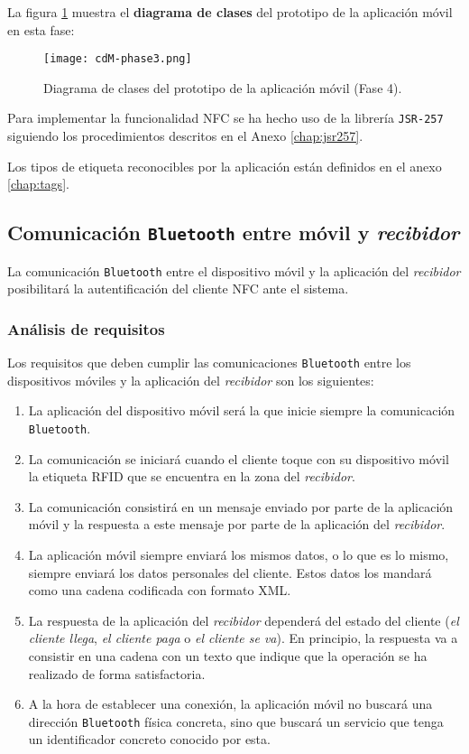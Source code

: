 La figura \ref{fig:cdM-phase3} muestra el \textbf{diagrama de clases} del
prototipo de la aplicación móvil en esta fase:

  \begin{figure}[H]
    \begin{center}
      \texttt{[image: cdM-phase3.png]}
      \caption{Diagrama de clases del prototipo de la aplicación móvil
      (Fase 4).}
      \label{fig:cdM-phase3}
    \end{center}
  \end{figure}

Para implementar la funcionalidad \acs{NFC} se ha hecho uso de la
librería \texttt{\acs{JSR}-257} siguiendo los procedimientos descritos en el 
Anexo \ref{chap:jsr257}.

Los tipos de etiqueta reconocibles por la aplicación están definidos en el 
anexo \ref{chap:tags}.

\subsection{Comunicación \texttt{Bluetooth} entre móvil y \emph{recibidor}}
\label{subsec:mobile-receiver}
La comunicación \texttt{Bluetooth} entre el dispositivo móvil y la aplicación
del \emph{recibidor} posibilitará la autentificación del cliente \acs{NFC}
ante el sistema.

\subsubsection{Análisis de requisitos}
Los requisitos que deben cumplir las comunicaciones \texttt{Bluetooth} entre
los dispositivos móviles y la aplicación del \emph{recibidor} son los
siguientes:
\begin{enumerate}
\item La aplicación del dispositivo móvil será la que inicie siempre la
comunicación \texttt{Bluetooth}.
\item La comunicación se iniciará cuando el cliente toque con su dispositivo
móvil la etiqueta \acs{RFID} que se encuentra en la zona del \emph{recibidor}.
\item La comunicación consistirá en un mensaje enviado por parte de la
aplicación móvil y la respuesta a este mensaje por parte de la aplicación
del \emph{recibidor}.
\item La aplicación móvil siempre enviará los mismos datos, o lo que es lo
mismo, siempre enviará los datos personales del cliente. Estos datos los
mandará como una cadena codificada con formato \acs{XML}.
\item La respuesta de la aplicación del \emph{recibidor} dependerá del estado
del cliente (\emph{el cliente llega}, \emph{el cliente paga} o \emph{el cliente
se va}). En principio, la respuesta va a consistir en una cadena con un texto
que indique que la operación se ha realizado de forma satisfactoria.
\item A la hora de establecer una conexión, la aplicación móvil no buscará una
dirección \texttt{Bluetooth} física concreta, sino que buscará un servicio que
tenga un identificador concreto conocido por esta.
\end{enumerate}
\newpage
